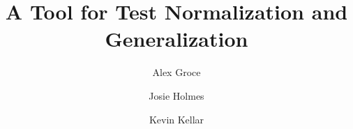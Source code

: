 \documentclass[format=sigconf]{acmart}
\newcommand{\mycomment}[1]{}
\begin{document}
\title{A Tool for Test Normalization and Generalization}

\author{Alex Groce}


\author{Josie Holmes}

\author{Kevin Kellar}


\begin{abstract}

\end{abstract}

\mycomment{

\author{\IEEEauthorblockN{%
Alex Groce,\IEEEauthorrefmark{1}
Josie Holmes\IEEEauthorrefmark{2}
Kevin Kellar\IEEEauthorrefmark{3}
}

\IEEEauthorblockA{\IEEEauthorrefmark{1}%
School of Electrical Engineering and Computer Science\\
Oregon State University\\
\IEEEauthorrefmark{2}
Department of Geography\\
Pennsylvania State University
\IEEEauthorrefmark{3}
Crescent Valley High School
}


}
}

\mycomment{
\numberofauthors{1}
\author{
\alignauthor
Arpit Christi, Matthew Lyle Olson, Mohammad Amin Alipour, Alex Groce\\
\affaddr{School of Electrical Engineering and Computer Science}\\
\affaddr{Oregon State University}
\affaddr{Corvallis, OR USA}\\
}
}
\end{document}
